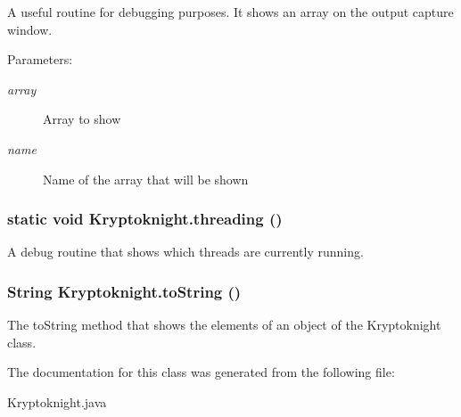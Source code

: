 A useful routine for debugging purposes. It shows an array on the output capture window. \begin{Desc}
\item[Parameters:]
\begin{description}
\item[{\em array}]Array to show \item[{\em name}]Name of the array that will be shown \end{description}
\end{Desc}
\hypertarget{class_kryptoknight_g1}{
\subsubsection[threading]{\setlength{\rightskip}{0pt plus 5cm}static void Kryptoknight.threading ()}}
\label{class_kryptoknight_g1}


A debug routine that shows which threads are currently running. \hypertarget{class_kryptoknight_a2}{
\subsubsection[toString]{\setlength{\rightskip}{0pt plus 5cm}String Kryptoknight.to\-String ()}}
\label{class_kryptoknight_a2}


The to\-String method that shows the elements of an object of the Kryptoknight class. 

The documentation for this class was generated from the following file:\begin{CompactItemize}
\item 
Kryptoknight.java\end{CompactItemize}
